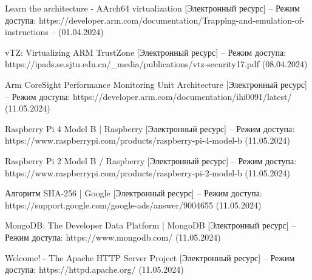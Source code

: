 \begin{thebibliography}{}
Learn the architecture - AArch64 virtualization [Электронный ресурс] – Режим доступа: https://developer.arm.com/documentation/Trapping-and-emulation-of-instructions – (01.04.2024)

vTZ: Virtualizing ARM TrustZone [Электронный ресурс] – Режим доступа:
https://ipads.se.sjtu.edu.cn/\_media/publications/vtz-security17.pdf (08.04.2024)

Arm CoreSight Performance Monitoring Unit Architecture [Электронный ресурс] – Режим доступа:
https://developer.arm.com/documentation/ihi0091/latest/ (11.05.2024)

Raspberry Pi 4 Model B | Raspberry [Электронный ресурс] – Режим доступа:
https://www.raspberrypi.com/products/raspberry-pi-4-model-b (11.05.2024)

Raspberry Pi 2 Model B / Raspberry [Электронный ресурс] – Режим доступа:
https://www.raspberrypi.com/products/raspberry-pi-2-model-b (11.05.2024)

Алгоритм SHA-256 | Google [Электронный ресурс] – Режим доступа:
https://support.google.com/google-ads/answer/9004655 (11.05.2024)

MongoDB: The Developer Data Platform | MongoDB  [Электронный ресурс] – Режим доступа:
https://www.mongodb.com/ (11.05.2024)

Welcome! - The Apache HTTP Server Project [Электронный ресурс] – Режим доступа:
https://httpd.apache.org/ (11.05.2024)

\end{thebibliography}
\endgroup

\pagebreak